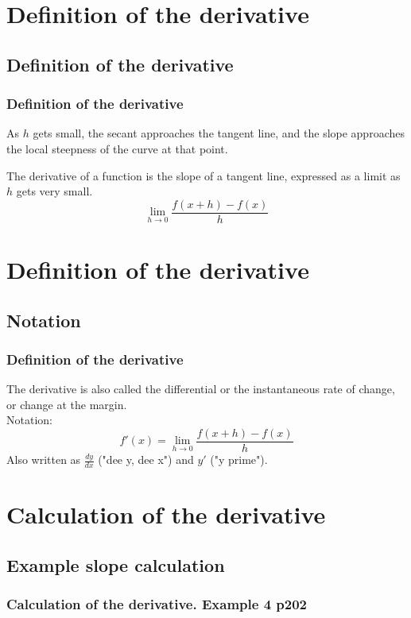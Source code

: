\documentclass{beamer}
\begin{document}
\section{Definition of the derivative}
\subsection{Definition of the derivative}
\frame
{
  \frametitle{Definition of the derivative}
  As $h$ gets small, the secant approaches the tangent line, and the slope approaches the local steepness of the curve at that point.
  \begin{definition}
  The \alert{derivative} of a function is the slope of a tangent line, expressed as a limit as $h$ gets very small.
  \[\lim_{h \rightarrow 0}\frac {f(x+h) - f(x)}{h}\]
  \end{definition}
  }

\section{Definition of the derivative}
\subsection{Notation}
\frame
{
  \frametitle{Definition of the derivative}
  The derivative is also called the \alert{differential} or the instantaneous rate of change, or change at the margin.\\[10pt]
  Notation:
  \[f'(x)=\lim_{h \rightarrow 0}\frac {f(x+h) - f(x)}{h}\]
  Also written as $\displaystyle \frac{dy}{dx}$ ("dee y, dee x") and $y'$ ("y prime").
  }
  
\section{Calculation of the derivative}
\subsection{Example slope calculation}
\frame
{
  \frametitle{Calculation of the derivative. Example 4 p202}

  }
  
\end{document}
